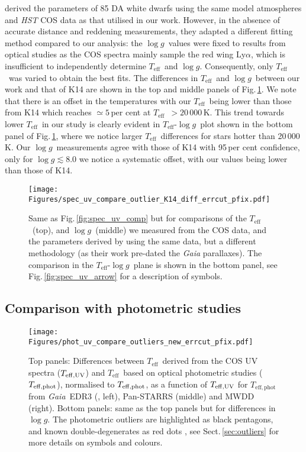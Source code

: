 \documentclass[fleqn,usenatbib, useAMS]{mnras}
\newcommand{\Teff}{\mbox{$T_{\mathrm{eff}}$}}
\newcommand{\logg}{\mbox{$\log g$}}
\begin{document}
\citet[hereafter, K14]{Koester2014} derived the parameters of 85 DA white dwarfs using the same model atmospheres and \textit{HST} COS data as that utilised in our work. However, in the absence of accurate distance and reddening measurements, they adapted a different fitting method compared to our analysis: the \logg\ values were fixed to results from optical studies as the COS spectra mainly sample the red wing Ly$\alpha$, which is insufficient to independently determine \Teff\ and \logg. Consequently, only \Teff\ was varied to obtain the best fits. The differences in \Teff\ and \logg\ between our work and that of K14 are shown in the top and middle panels of Fig.\,\ref{fig:spec_uv_comp_k14}. We note that there is an offset in the temperatures with our \Teff\ being lower than those from K14 which reaches $\simeq5$\,per cent at \Teff\ $>20\,000$\,K. This trend towards lower \Teff\ in our study is clearly evident in \Teff-\logg\ plot shown in the bottom panel of Fig.\,\ref{fig:spec_uv_comp_k14}, where we notice larger \Teff\ differences for stars hotter than 20\,000\,K. Our \logg\ measurements agree with those of K14 with 95\,per cent confidence, only for $\logg\lesssim8.0$ we notice a systematic offset, with our values being lower than those of K14. 

\begin{figure}
\centering
\texttt{[image: Figures/spec\_uv\_compare\_outlier\_K14\_diff\_errcut\_pfix.pdf]}
\caption{Same as Fig.\,\ref{fig:spec_uv_comp} but for comparisons of the \Teff\ (top), and \logg\ (middle) we measured from the COS data, and the parameters derived by \citet{Koester2014} using the same data, but a different methodology (as their work pre-dated the \textit{Gaia} parallaxes). The comparison in the \Teff-\logg\ plane is shown in the bottom panel, see Fig.\,\ref{fig:spec_uv_arrow} for a description of symbols.}
\label{fig:spec_uv_comp_k14}
\end{figure}


\subsection{Comparison with photometric studies}

\begin{figure*}
\centering
\texttt{[image: Figures/phot\_uv\_compare\_outliers\_new\_errcut\_pfix.pdf]}
\caption{Top panels: Differences between \Teff\ derived from the COS UV spectra ($T_{\rm{eff,UV}}$) and \Teff\ based on optical photometric studies ($T_{\rm{eff,phot}}$), normalised to  $T_{\rm{eff,phot}}$, as a function of  $T_{\rm{eff,UV}}$ for $T_\mathrm{eff,phot}$ from \textit{Gaia}~EDR3 (\citealt{nicola2021}, left), Pan-STARRS (middle) and MWDD (right). Bottom panels: same as the top panels but for differences in \logg. The photometric outliers are highlighted as black pentagons, and known double-degenerates as red dots \citep{Koester2009}, see Sect.\,\ref{sec:outliers} for more details on symbols and colours.}
\label{fig:phot_uv_comp}
\end{figure*}
\end{document}
